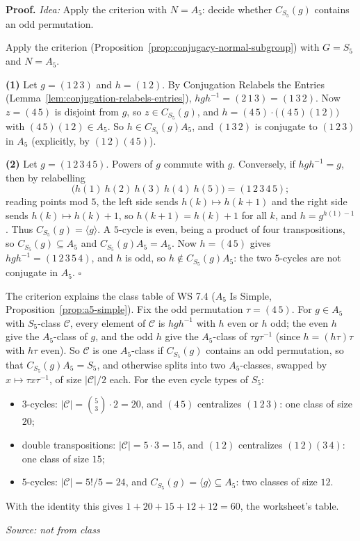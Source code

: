 \documentclass[11pt]{report}
\renewenvironment{proof}[1][Proof]{\noindent\textbf{#1.} }{\hfill$\square$\par\vspace{5pt}}
\newcommand{\srcline}[1]{\par\hfill{\footnotesize\textit{Source: #1}}}
\begin{document}
\begin{proof}
\textit{Idea:} Apply the criterion with $N = A_5$: decide whether $C_{S_5}(g)$ contains an odd permutation.\par
Apply the criterion (Proposition~\ref{prop:conjugacy-normal-subgroup}) with $G = S_5$ and $N = A_5$.

\textbf{(1)} Let $g = (1\,2\,3)$ and $h = (1\,2)$. By Conjugation Relabels the Entries (Lemma~\ref{lem:conjugation-relabels-entries}), $hgh^{-1} = (2\,1\,3) = (1\,3\,2)$. Now $z = (4\,5)$ is disjoint from $g$, so $z \in C_{S_5}(g)$, and $h = (4\,5)\cdot\big((4\,5)(1\,2)\big)$ with $(4\,5)(1\,2) \in A_5$. So $h \in C_{S_5}(g)A_5$, and $(1\,3\,2)$ is conjugate to $(1\,2\,3)$ in $A_5$ (explicitly, by $(1\,2)(4\,5)$).

\textbf{(2)} Let $g = (1\,2\,3\,4\,5)$. Powers of $g$ commute with $g$. Conversely, if $hgh^{-1} = g$, then by relabelling
\[ \big(h(1)\ h(2)\ h(3)\ h(4)\ h(5)\big) = (1\,2\,3\,4\,5); \]
reading points mod $5$, the left side sends $h(k) \mapsto h(k+1)$ and the right side sends $h(k) \mapsto h(k) + 1$, so $h(k+1) = h(k) + 1$ for all $k$, and $h = g^{h(1) - 1}$. Thus $C_{S_5}(g) = \langle g \rangle$. A $5$-cycle is even, being a product of four transpositions, so $C_{S_5}(g) \subseteq A_5$ and $C_{S_5}(g)A_5 = A_5$. Now $h = (4\,5)$ gives $hgh^{-1} = (1\,2\,3\,5\,4)$, and $h$ is odd, so $h \notin C_{S_5}(g)A_5$: the two $5$-cycles are not conjugate in $A_5$.
\end{proof}

\begin{exbox}\label{ex:conjugacy-classes-a5-explained}
The criterion explains the class table of WS 7.4 ($A_5$ Is Simple, Proposition~\ref{prop:a5-simple}). Fix the odd permutation $\tau = (4\,5)$. For $g \in A_5$ with $S_5$-class $\mathcal{C}$, every element of $\mathcal{C}$ is $hgh^{-1}$ with $h$ even or $h$ odd; the even $h$ give the $A_5$-class of $g$, and the odd $h$ give the $A_5$-class of $\tau g\tau^{-1}$ (since $h = (h\tau)\tau$ with $h\tau$ even). So $\mathcal{C}$ is one $A_5$-class if $C_{S_5}(g)$ contains an odd permutation, so that $C_{S_5}(g)A_5 = S_5$, and otherwise splits into two $A_5$-classes, swapped by $x \mapsto \tau x \tau^{-1}$, of size $|\mathcal{C}|/2$ each. For the even cycle types of $S_5$:
\begin{itemize}[nosep]
    \item $3$-cycles: $|\mathcal{C}| = \binom{5}{3} \cdot 2 = 20$, and $(4\,5)$ centralizes $(1\,2\,3)$: one class of size $20$;
    \item double transpositions: $|\mathcal{C}| = 5 \cdot 3 = 15$, and $(1\,2)$ centralizes $(1\,2)(3\,4)$: one class of size $15$;
    \item $5$-cycles: $|\mathcal{C}| = 5!/5 = 24$, and $C_{S_5}(g) = \langle g \rangle \subseteq A_5$: two classes of size $12$.
\end{itemize}
With the identity this gives $1 + 20 + 15 + 12 + 12 = 60$, the worksheet's table.
\srcline{not from class}
\end{exbox}
\end{document}
